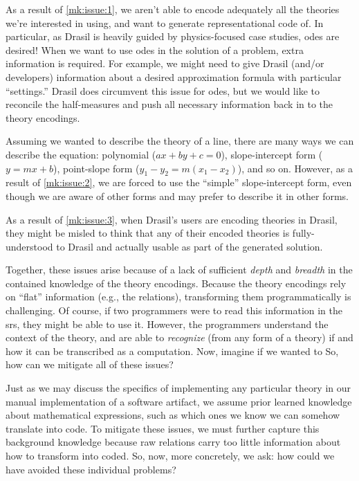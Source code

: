 As a result of \ref{mk:issue:1}, we aren't able to encode adequately all the
theories we're interested in using, and want to generate representational code
of. In particular, as Drasil is heavily guided by physics-focused case studies,
\acsp{ode} are desired! When we want to use \acsp{ode} in the solution of a
problem, extra information is required. For example, we might need to give
Drasil (and/or developers) information about a desired approximation formula
with particular ``settings.'' Drasil does circumvent this issue for \acsp{ode},
but we would like to reconcile the half-measures and push all necessary
information back in to the theory encodings.

Assuming we wanted to describe the theory of a line, there are many ways we can
describe the equation: polynomial (\(ax + by + c = 0\)), slope-intercept form
(\(y = mx + b\)), point-slope form (\(y_1 - y_2 = m(x_1 - x_2)\)), and so on.
However, as a result of \ref{mk:issue:2}, we are forced to use the ``simple''
slope-intercept form, even though we are aware of other forms and may prefer to
describe it in other forms.

As a result of \ref{mk:issue:3}, when Drasil's users are encoding theories in
Drasil, they might be misled to think that any of their encoded theories is
fully-understood to Drasil and actually usable as part of the generated solution.

Together, these issues arise because of a lack of sufficient \textit{depth} and
\textit{breadth} in the contained knowledge of the theory encodings. Because the
theory encodings rely on ``flat'' information (e.g., the relations),
transforming them programmatically is challenging. Of course, if two programmers
were to read this information in the \acs{srs}, they might be able to use it.
However, the programmers understand the context of the theory, and are able to
\textit{recognize} (from any form of a theory) if and how it can be transcribed
as a computation. Now, imagine if we wanted to  So, how can we mitigate all of
these issues?

Just as we may discuss the specifics of implementing any particular theory in
our manual implementation of a software artifact, we assume prior learned
knowledge about mathematical expressions, such as which ones we know we can
somehow translate into code. To mitigate these issues, we must further capture
this background knowledge because raw relations carry too little information
about how to transform into coded. So, now, more concretely, we ask: how could
we have avoided these individual problems?

